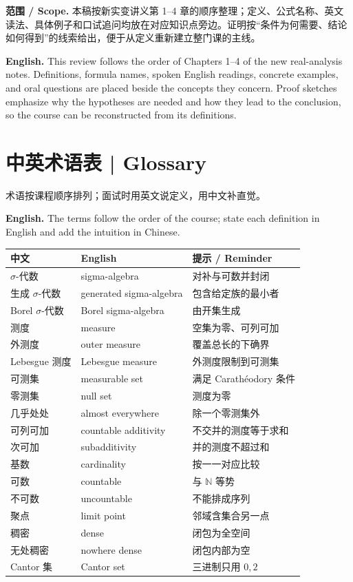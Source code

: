\documentclass[UTF8,11pt,a4paper]{ctexart}
\newcommand{\EN}[1]{\par\noindent\textbf{English.} #1\par}
\begin{document}
\noindent\textbf{范围 / Scope.} 本稿按新实变讲义第 1--4 章的顺序整理；定义、公式名称、英文读法、具体例子和口试追问均放在对应知识点旁边。证明按“条件为何需要、结论如何得到”的线索给出，便于从定义重新建立整门课的主线。
\EN{This review follows the order of Chapters 1--4 of the new real-analysis notes. Definitions, formula names, spoken English readings, concrete examples, and oral questions are placed beside the concepts they concern. Proof sketches emphasize why the hypotheses are needed and how they lead to the conclusion, so the course can be reconstructed from its definitions.}

\section*{中英术语表 | Glossary}
\noindent 术语按课程顺序排列；面试时用英文说定义，用中文补直觉。
\EN{The terms follow the order of the course; state each definition in English and add the intuition in Chinese.}
\begin{center}\small
\renewcommand{\arraystretch}{1.08}
\begin{tabular}{@{}p{4.4cm}p{6.5cm}p{4.9cm}@{}}
\hline
中文 & English & 提示 / Reminder\\
\hline
$\sigma$-代数 & sigma-algebra & 对补与可数并封闭\\
生成 $\sigma$-代数 & generated sigma-algebra & 包含给定族的最小者\\
Borel $\sigma$-代数 & Borel sigma-algebra & 由开集生成\\
测度 & measure & 空集为零、可列可加\\
外测度 & outer measure & 覆盖总长的下确界\\
Lebesgue 测度 & Lebesgue measure & 外测度限制到可测集\\
可测集 & measurable set & 满足 Carath\'eodory 条件\\
零测集 & null set & 测度为零\\
几乎处处 & almost everywhere & 除一个零测集外\\
可列可加 & countable additivity & 不交并的测度等于求和\\
次可加 & subadditivity & 并的测度不超过和\\
基数 & cardinality & 按一一对应比较\\
可数 & countable & 与 $\mathbb N$ 等势\\
不可数 & uncountable & 不能排成序列\\
聚点 & limit point & 邻域含集合另一点\\
稠密 & dense & 闭包为全空间\\
无处稠密 & nowhere dense & 闭包内部为空\\
Cantor 集 & Cantor set & 三进制只用 $0,2$\\
\hline
\end{tabular}
\end{center}
\end{document}
